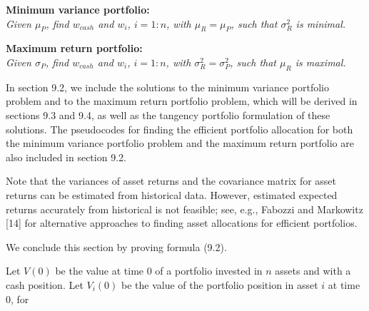 \noindent\textbf{Minimum variance portfolio:}\\
\textit{Given $\mu_P$, find $w_{cash}$ and $w_i$, $i = 1:n$, with $\mu_R = \mu_P$, such
that $\sigma_R^2$ is minimal.}

\noindent\textbf{Maximum return portfolio:}\\
\textit{Given $\sigma_P$, find $w_{cash}$ and $w_i$, $i = 1:n$, with $\sigma_R^2 =
\sigma_P^2$, such that $\mu_R$ is maximal.}

In section 9.2, we include the solutions to the minimum variance portfolio problem and
to the maximum return portfolio problem, which will be derived in sections 9.3 and 9.4,
as well as the tangency portfolio formulation of these solutions. The pseudocodes for
finding the efficient portfolio allocation for both the minimum variance portfolio
problem and the maximum return portfolio are also included in section 9.2.

Note that the variances of asset returns and the covariance matrix for asset returns
can be estimated from historical data. However, estimated expected returns accurately
from historical is not feasible; see, e.g., Fabozzi and Markowitz [14] for alternative
approaches to finding asset allocations for efficient portfolios.

We conclude this section by proving formula (9.2).

Let $V(0)$ be the value at time 0 of a portfolio invested in $n$ assets and with a cash
position. Let $V_i(0)$ be the value of the portfolio position in asset $i$ at time 0, for
